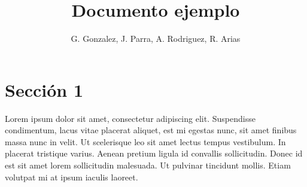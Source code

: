 \documentclass[runningheads]{llncs}
\begin{document}
%
\title{Documento ejemplo}
%
%

\author{G. Gonzalez, J. Parra, A. Rodriguez, R. Arias}
%
%



%
%
\maketitle              %
%
%
%
%

\section{Sección 1}

Lorem ipsum dolor sit amet, consectetur adipiscing elit. Suspendisse condimentum, lacus vitae placerat aliquet, est mi egestas nunc, sit amet finibus massa nunc in velit. Ut scelerisque leo sit amet lectus tempus vestibulum. In placerat tristique varius. Aenean pretium ligula id convallis sollicitudin. Donec id est sit amet lorem sollicitudin malesuada. Ut pulvinar tincidunt mollis. Etiam volutpat mi at ipsum iaculis laoreet.
\end{document}
